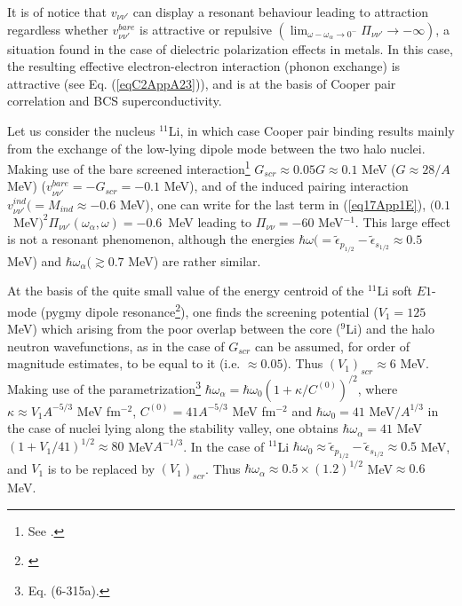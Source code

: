 \begin{subappendices}
It is of notice that $v_{\nu\nu'}$ can display a resonant behaviour leading to attraction regardless whether $v_{\nu\nu'}^{bare}$ is attractive or repulsive $(\lim_{\omega-\omega_\alpha\to0^-}\Pi_{\nu\nu'}\to-\infty)$, a situation found in the case of dielectric polarization effects in metals. In this case, the resulting effective electron-electron interaction (phonon exchange) is attractive (see Eq. (\ref{eqC2AppA23})), and is at the basis of Cooper pair correlation and BCS superconductivity.

Let us consider the nucleus $^{11}$Li, in which case Cooper pair binding results mainly from the exchange of the low-lying dipole mode between the two halo nuclei. Making use of the bare screened interaction\footnote{See \cite{Broglia:19b}.} $G_{scr}\approx0.05G\approx0.1$ MeV ($G\approx 28/A$ MeV) ($v_{\nu\nu'}^{bare}=-G_{scr}=-0.1$ MeV), and of the induced pairing interaction $v^{ind}_{\nu\nu'}(=M_{ind}\approx-0.6$ MeV), one can write for the last term in (\ref{eq17App1E}), \mbox{$(0.1$ MeV$)^2\Pi_{\nu\nu'}(\omega_\alpha,\omega)=-0.6$ MeV} leading to $\Pi_{\nu\nu}=-60$ MeV$^{-1}$. This large effect is not a resonant phenomenon, although the energies $\hbar\omega(=\tilde\epsilon_{p_{1/2}}-\tilde\epsilon_{s_{1/2}}\approx0.5$ MeV) and $\hbar\omega_\alpha(\gtrsim0.7$ MeV) are rather similar. 

At the basis of the quite small value of the energy centroid of the $^{11}$Li soft $E1$-mode (pygmy dipole resonance\footnote{\cite{Broglia:19}}), one finds the screening potential ($V_1=125$ MeV) which arising from the poor overlap between the core ($^9$Li) and the halo neutron wavefunctions, as in the case of $G_{scr}$ can be assumed, for order of magnitude estimates, to be equal to it (i.e. $\approx0.05$). Thus $(V_1)_{scr}\approx6$ MeV. Making use of the parametrization\footnote{\cite{Bohr:75} Eq. (6-315a).} $\hbar\omega_\alpha=\hbar\omega_0\left(1+\kappa/C^{(0)}\right)^{/2}$, where $\kappa\approx V_1 A^{-5/3}$ MeV fm$^{-2}$, $C^{(0)}=41A^{-5/3}$ MeV fm$^{-2}$ and $\hbar\omega_0=41$ MeV$/A^{1/3}$ in the case of nuclei lying along the stability valley, one obtains $\hbar\omega_\alpha=41$ MeV$\left(1+V_1/41\right)^{1/2}\approx80$ MeV$A^{-1/3}$. In the case of $^{11}$Li $\hbar\omega_0\approx\tilde\epsilon_{p_{1/2}}-\tilde\epsilon_{s_{1/2}}\approx0.5$ MeV, and $V_1$ is to be replaced by $(V_1)_{scr}$. Thus $\hbar\omega_\alpha\approx0.5\times(1.2)^{1/2}$  MeV$\approx0.6$ MeV.


\end{subappendices}
